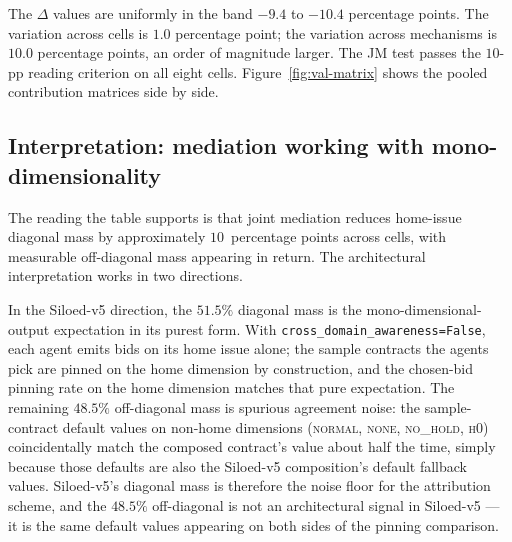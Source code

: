 The $\Delta$ values are uniformly in the band $-9.4$ to $-10.4$
percentage points. The variation across cells is $1.0$ percentage
point; the variation across mechanisms is $10.0$ percentage points,
an order of magnitude larger. The JM test passes the $10$-pp reading
criterion on all eight cells. Figure~\ref{fig:val-matrix} shows the
pooled contribution matrices side by side.


\subsection*{Interpretation: mediation working with mono-dimensionality}

The reading the table supports is that joint mediation reduces
home-issue diagonal mass by approximately $10$~percentage points
across cells, with measurable off-diagonal mass appearing in
return. The architectural interpretation works in two directions.

In the Siloed-v5 direction, the $51.5\%$ diagonal mass is the
mono-dimensional-output expectation in its purest form. With
\texttt{cross\_domain\_awareness=False}, each agent emits bids on its
home issue alone; the sample contracts the agents pick are pinned on
the home dimension by construction, and the chosen-bid pinning rate
on the home dimension matches that pure expectation. The remaining
$48.5\%$ off-diagonal mass is spurious agreement noise: the
sample-contract default values on non-home dimensions
(\textsc{normal}, \textsc{none}, \textsc{no\_hold}, \textsc{h0})
coincidentally match the composed contract's value about half the
time, simply because those defaults are also the Siloed-v5
composition's default fallback values. Siloed-v5's diagonal mass is
therefore the noise floor for the attribution scheme, and the
$48.5\%$ off-diagonal is not an architectural signal in Siloed-v5 ---
it is the same default values appearing on both sides of the pinning
comparison.

